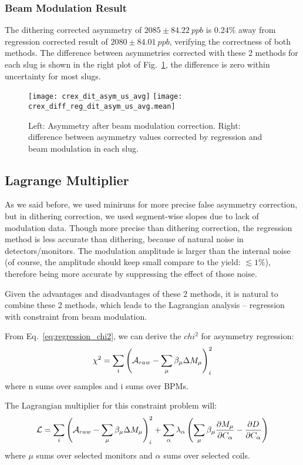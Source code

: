 \subsubsection{Beam Modulation Result}
The dithering corrected asymmetry of $2085 \pm 84.22\ ppb$ is $0.24\%$ away from
regression corrected result of $2080 \pm 84.01\ ppb$, verifying the correctness
of both methods. The difference between asymmetries corrected with these 2 methods
for each slug is shown in the right plot of Fig.~\ref{fig:dit_result}, the difference
is zero within uncertainty for most slugs.
\begin{figure}[H]
    \centering
    \texttt{[image: crex\_dit\_asym\_us\_avg]}
    \texttt{[image: crex\_diff\_reg\_dit\_asym\_us\_avg.mean]}
    \caption{Left: Asymmetry after beam modulation correction.
    Right: difference between asymmetry values corrected by regression and
    beam modulation in each slug.}
    \label{fig:dit_result}
\end{figure}


\subsection{Lagrange Multiplier}
As we said before, we used miniruns for more precise false asymmetry correction, 
but in dithering correction, we used segment-wise slopes due to lack of modulation
data. Though more precise than dithering correction, the regression method is 
less accurate than dithering, because of natural noise in detectors/monitors. 
The modulation amplitude is larger than the internal noise (of course, the amplitude
should keep small compare to the yield: $\lesssim 1\%$), therefore being
more accurate by suppressing the effect of those noise.

Given the advantages and disadvantages of these 2 methods, it is natural to 
combine these 2 methods, which leads to the Lagrangian analysis -- regression
with constraint from beam modulation.

From Eq.~\ref{eq:regression_chi2}, we can derive the $chi^2$ for asymmetry regression:
\begin{equation}
    \chi^2 = \sum_i \left( \mathcal{A}_{raw} - \sum_\mu \beta_\mu \Delta M_\mu \right)_i^2
\end{equation}
where n sums over samples and i sums over BPMs.

The Lagrangian multiplier for this constraint problem will:
\begin{equation}
    \mathcal{L} = \sum_i \left( \mathcal{A}_{raw} - \sum_\mu \beta_\mu \Delta M_\mu \right)_i^2+ \sum_\alpha \lambda_\alpha \left(\sum_\mu \beta_\mu \frac{\partial M_\mu}{\partial C_\alpha} - \frac{\partial D}{\partial C_\alpha} \right)
\end{equation}
where $\mu$ sums over selected monitors and $\alpha$ sums over selected coils.

